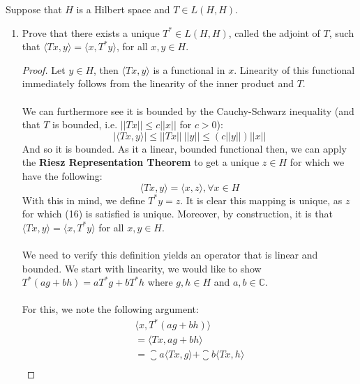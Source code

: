 \documentclass[12pt]{article}
\newenvironment{ex}[2][Exercise]{\begin{trivlist}
\item[\hskip \labelsep {\bfseries #1}\hskip \labelsep {\bfseries #2.}]}{\end{trivlist}}
\begin{document}
\begin{ex}{8}
    Suppose that $H$ is a Hilbert space and $T \in L(H,H)$.
    \begin{enumerate}[label=(\alph*)]
        \item Prove that there exists a unique $T^* \in L(H,H)$, called the adjoint of $T$, such that $\langle Tx, y \rangle = \langle x, T^*y \rangle$, for all $x, y \in H$.
        \begin{proof}
            Let $y \in H$, then $\langle Tx, y \rangle$ is a functional in $x$. Linearity of this functional immediately follows from the linearity of the inner product and $T$. \\ \\
            We can furthermore see it is bounded by the Cauchy-Schwarz inequality (and that $T$ is bounded, i.e. $||Tx|| \leq c||x||$ for $c > 0$):
            \begin{equation}
                |\langle Tx, y \rangle| \leq ||Tx||\:||y|| \leq (c||y||)||x||
            \end{equation}
            And so it is bounded. As it a linear, bounded functional then, we can apply the \textbf{Riesz Representation Theorem} to get a unique $z \in H$ for which we have the following:
            \begin{equation}
                \langle Tx, y \rangle = \langle x, z \rangle, \forall x \in H
            \end{equation}
            With this in mind, we define $T^*y = z$. It is clear this mapping is unique, as $z$ for which (16) is satisfied is unique. Moreover, by construction, it is that $\langle Tx, y \rangle = \langle x, T^*y \rangle$ for all $x, y \in H$.
            \\ \\
            We need to verify this definition yields an operator that is linear and bounded. We start with linearity, we would like to show $T^*(ag + bh) = aT^*g + bT^*h$ where $g, h \in H$ and $a, b \in \mathbb{C}$. \\ \\
            For this, we note the following argument:
            \begin{equation}
                \begin{aligned}
                    \langle x, T^*(ag + bh) \rangle \\
                    = \langle Tx, ag + bh \rangle \\
                    = \closure{a}\langle Tx, g \rangle + \closure{b} \langle Tx, h \rangle \\

\end{aligned}
\end{equation}
\end{proof}
\end{enumerate}
\end{ex}
\end{document}
